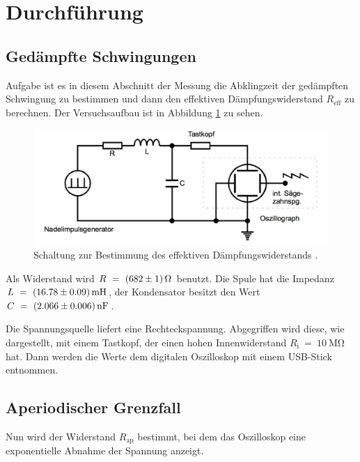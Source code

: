  \section{Durchführung}
\label{sec:Durchführung}

\subsection{Gedämpfte Schwingungen}
\label{sec:durchgedschw}

Aufgabe ist es in diesem Abschnitt der Messung die Abklingzeit der gedämpften
Schwingung zu bestimmen und dann den effektiven Dämpfungswiderstand $R_{\text{eff}}$
zu berechnen.
Der Versuchsaufbau ist in Abbildung \ref{fig:schalta} zu sehen.

\begin{figure}[h]
  \centering
  \includegraphics[width = \textwidth]{Schaltunga.pdf}
  \caption{Schaltung zur Bestimmung des effektiven Dämpfungswiderstands \cite{anleitung}.}
  \label{fig:schalta}
\end{figure}

Als Widerstand wird $R~=~\SI{682 +- 1}{\ohm}$ benutzt. Die Spule hat
die Impedanz $L~=~\SI{16.78 +- 0.09}{\milli\henry}$, der Kondensator besitzt
den Wert $C~=~\SI{2.066 +- 0.006}{\nano\farad}$.

Die Spannungsquelle liefert eine Rechteckspannung. Abgegriffen wird diese,
wie dargestellt, mit einem Tastkopf, der einen hohen Innenwiderstand
$R_{\text{i}}~=~\SI{10}{\mega\ohm}$ hat. Dann werden die Werte dem digitalen
Oszilloskop mit einem USB-Stick entnommen.

\subsection{Aperiodischer Grenzfall}

Nun wird der Widerstand $R_{\text{ap}}$ bestimmt, bei dem das Oszilloskop
eine exponentielle Abnahme der Spannung anzeigt.

